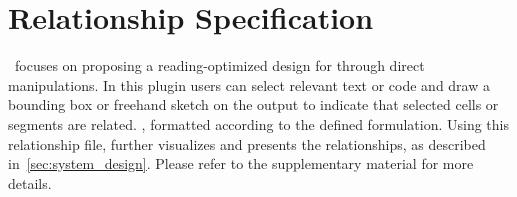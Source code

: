 \section{Relationship Specification}

\tool~focuses on proposing a reading-optimized design for 
through direct manipulations.
In this plugin users can select relevant text or code and draw a bounding box or freehand sketch on the output to indicate that selected cells or segments are related.
, formatted according to the defined formulation.
Using this relationship file, \tool further visualizes and presents the relationships, as described in~\autoref{sec:system_design}.
Please refer to the supplementary material for more details.



